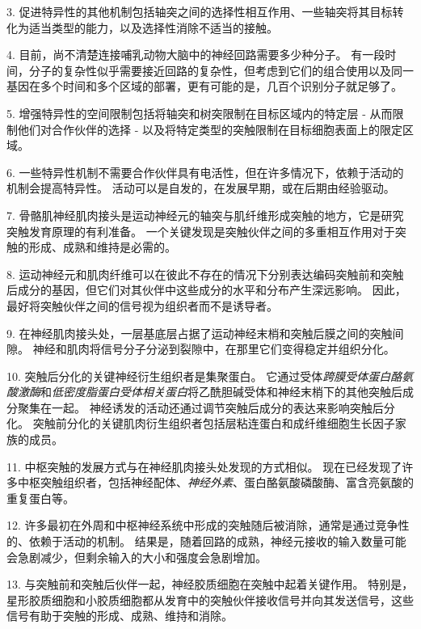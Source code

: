 3. 促进特异性的其他机制包括轴突之间的选择性相互作用、一些轴突将其目标转化为适当类型的能力，以及选择性消除不适当的接触。


4. 目前，尚不清楚连接哺乳动物大脑中的神经回路需要多少种分子。
有一段时间，分子的复杂性似乎需要接近回路的复杂性，但考虑到它们的组合使用以及同一基因在多个时间和多个区域的部署，更有可能的是，几百个识别分子就足够了。


5. 增强特异性的空间限制包括将轴突和树突限制在目标区域内的特定层 - 从而限制他们对合作伙伴的选择 - 以及将特定类型的突触限制在目标细胞表面上的限定区域。 


6. 一些特异性机制不需要合作伙伴具有电活性，但在许多情况下，依赖于活动的机制会提高特异性。
活动可以是自发的，在发展早期，或在后期由经验驱动。 


7. 骨骼肌神经肌肉接头是运动神经元的轴突与肌纤维形成突触的地方，它是研究突触发育原理的有利准备。
一个关键发现是突触伙伴之间的多重相互作用对于突触的形成、成熟和维持是必需的。


8. 运动神经元和肌肉纤维可以在彼此不存在的情况下分别表达编码突触前和突触后成分的基因，但它们对其伙伴中这些成分的水平和分布产生深远影响。
因此，最好将突触伙伴之间的信号视为组织者而不是诱导者。


9. 在神经肌肉接头处，一层基底层占据了运动神经末梢和突触后膜之间的突触间隙。
神经和肌肉将信号分子分泌到裂隙中，在那里它们变得稳定并组织分化。


10. 突触后分化的关键神经衍生组织者是集聚蛋白。
它通过受体\textit{跨膜受体蛋白酪氨酸激酶}和\textit{低密度脂蛋白受体相关蛋白}将乙酰胆碱受体和神经末梢下的其他突触后成分聚集在一起。
神经诱发的活动还通过调节突触后成分的表达来影响突触后分化。
突触前分化的关键肌肉衍生组织者包括层粘连蛋白和成纤维细胞生长因子家族的成员。


11. 中枢突触的发展方式与在神经肌肉接头处发现的方式相似。
现在已经发现了许多中枢突触组织者，包括神经配体、\textit{神经外素}、蛋白酪氨酸磷酸酶、富含亮氨酸的重复蛋白等。


12. 许多最初在外周和中枢神经系统中形成的突触随后被消除，通常是通过竞争性的、依赖于活动的机制。
结果是，随着回路的成熟，神经元接收的输入数量可能会急剧减少，但剩余输入的大小和强度会急剧增加。


13. 与突触前和突触后伙伴一起，神经胶质细胞在突触中起着关键作用。
特别是，星形胶质细胞和小胶质细胞都从发育中的突触伙伴接收信号并向其发送信号，这些信号有助于突触的形成、成熟、维持和消除。


